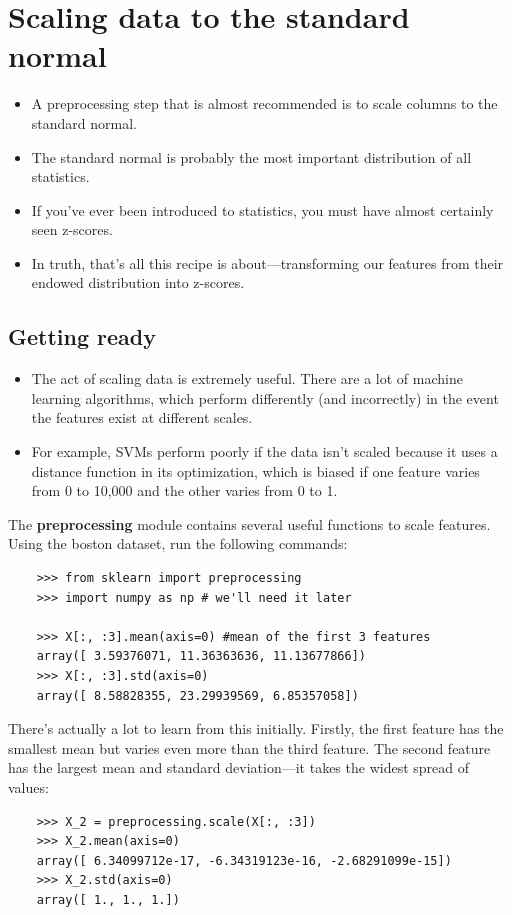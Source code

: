 \documentclass[SKL-MASTER.tex]{subfiles}
\begin{document}
	\Large
\section*{Scaling data to the standard normal}
\begin{itemize}
\item A preprocessing step that is almost recommended is to scale columns to the standard
normal. 
\item The standard normal is probably the most important distribution of all statistics.
\item If you've ever been introduced to statistics, you must have almost certainly seen z-scores.
\item In truth, that's all this recipe is about—transforming our features from their endowed
distribution into z-scores.
\end{itemize}

\subsection*{Getting ready}
\begin{itemize}
\item The act of scaling data is extremely useful. There are a lot of machine learning algorithms,
which perform differently (and incorrectly) in the event the features exist at different scales.
\item For example, SVMs perform poorly if the data isn't scaled because it uses a distance function
in its optimization, which is biased if one feature varies from 0 to 10,000 and the other varies
from 0 to 1.
\end{itemize}
\newpage
The \textbf{preprocessing} module contains several useful functions to scale features. 	
Using the boston dataset, run the following commands:
\begin{framed}
	\begin{verbatim}
	>>> from sklearn import preprocessing
	>>> import numpy as np # we'll need it later

	>>> X[:, :3].mean(axis=0) #mean of the first 3 features
	array([ 3.59376071, 11.36363636, 11.13677866])
	>>> X[:, :3].std(axis=0)
	array([ 8.58828355, 23.29939569, 6.85357058])
\end{verbatim}
\end{framed}
	There's actually a lot to learn from this initially. Firstly, the first feature has the smallest mean
	but varies even more than the third feature. The second feature has the largest mean and
	standard deviation—it takes the widest spread of values:
	\begin{framed}
		\begin{verbatim}
	>>> X_2 = preprocessing.scale(X[:, :3])
	>>> X_2.mean(axis=0)
	array([ 6.34099712e-17, -6.34319123e-16, -2.68291099e-15])
	>>> X_2.std(axis=0)
	array([ 1., 1., 1.])
\end{verbatim}
\end{framed}
\newpage
\end{document}
